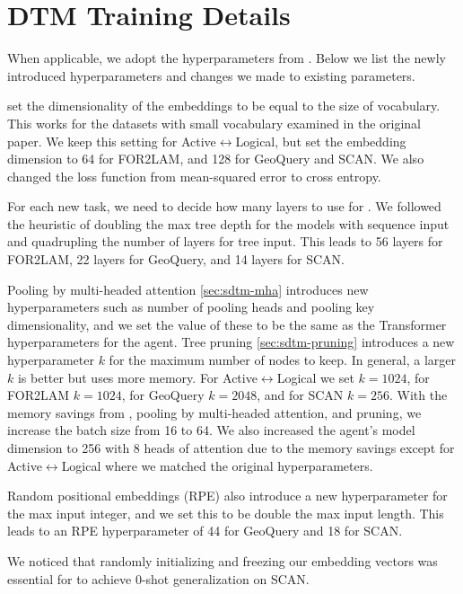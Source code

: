 \section{DTM Training Details} \label{sec:sdtm-dtm-training}
When applicable, we adopt the hyperparameters from \citet{Soulos_2023_DifferentiableTreeOperations}. Below we list the newly introduced hyperparameters and changes we made to existing parameters.

\citet{Soulos_2023_DifferentiableTreeOperations} set the dimensionality of the embeddings to be equal to the size of vocabulary. This works for the datasets with small vocabulary examined in the original paper. We keep this setting for Active$\leftrightarrow$Logical, but set the embedding dimension to 64 for FOR2LAM, and 128 for GeoQuery and SCAN. We also changed the loss function from mean-squared error to cross entropy.

For each new task, we need to decide how many layers to use for \sdtm. We followed the heuristic of doubling the max tree depth for the models with sequence input and quadrupling the number of layers for tree input. This leads to 56 layers for FOR2LAM, 22 layers for GeoQuery, and 14 layers for SCAN.

Pooling by multi-headed attention \ref{sec:sdtm-mha} introduces new hyperparameters such as number of pooling heads and pooling key dimensionality, and we set the value of these to be the same as the Transformer hyperparameters for the agent. Tree pruning \ref{sec:sdtm-pruning} introduces a new hyperparameter $k$ for the maximum number of nodes to keep. In general, a larger $k$ is better but uses more memory. For Active$\leftrightarrow$Logical we set $k=1024$, for FOR2LAM $k=1024$, for GeoQuery $k=2048$, and for SCAN $k=256$. With the memory savings from \abvrepname, pooling by multi-headed attention, and pruning, we increase the batch size from 16 to 64. We also increased the agent's model dimension to 256 with 8 heads of attention due to the memory savings except for Active$\leftrightarrow$Logical where we matched the original hyperparameters.

Random positional embeddings (RPE) also introduce a new hyperparameter for the max input integer, and we set this to be double the max input length. This leads to an RPE hyperparameter of 44 for GeoQuery and 18 for SCAN.

We noticed that randomly initializing and freezing our embedding vectors was essential for \sdtm to achieve 0-shot generalization on SCAN.

